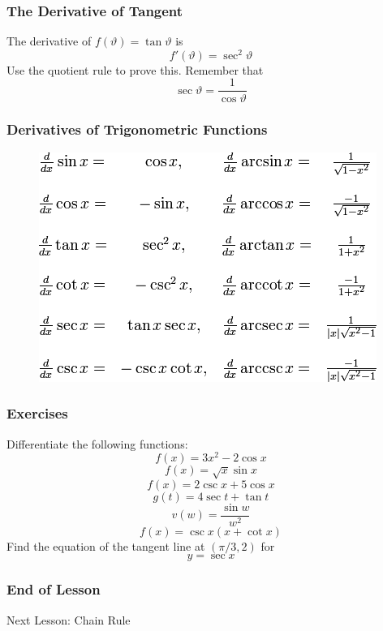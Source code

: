 \documentclass[xcolor=dvipsnames]{beamer}
\begin{document}
\begin{frame}
  \frametitle{The Derivative of Tangent}
The derivative of $f(\vartheta)=\tan\vartheta$ is 
\begin{equation}
  \label{eq:uulohjeo}
  f'(\vartheta)=\sec^{2}\vartheta
\end{equation}
Use the quotient rule to prove this. Remember that 
\begin{equation}
  \label{eq:shooceid}
  \sec\vartheta=\frac{1}{\cos\vartheta}
\end{equation}
\end{frame}

\begin{frame}
  \frametitle{Derivatives of Trigonometric Functions}
\begin{figure}[h]
\includegraphics[scale=.6]{./diagrams/trigdiff.png}
\end{figure}
\end{frame}

\begin{frame}
  \frametitle{Exercises}
Differentiate the following functions:
\begin{equation}
  \label{eq:hupuxahz}
  f(x)=3x^{2}-2\cos{}x
\end{equation}
\begin{equation}
  \label{eq:vithooke}
  f(x)=\sqrt{x}\sin{}x
\end{equation}
\begin{equation}
  \label{eq:chaequin}
  f(x)=2\csc{}x+5\cos{}x
\end{equation}
\begin{equation}
  \label{eq:hohxenoo}
  g(t)=4\sec{}t+\tan{}t
\end{equation}
\begin{equation}
  \label{eq:tohsohgh}
  v(w)=\frac{\sin{}w}{w^{2}}
\end{equation}
\begin{equation}
  \label{eq:zichoope}
  f(x)=\csc{}x(x+\cot{}x)
\end{equation}
Find the equation of the tangent line at $(\pi/3,2)$ for
\begin{equation}
  \label{eq:hoirohfo}
  y=\sec{}x
\end{equation}
\end{frame}

\begin{frame}
  \frametitle{End of Lesson}
Next Lesson: Chain Rule
\end{frame}
\end{document}
